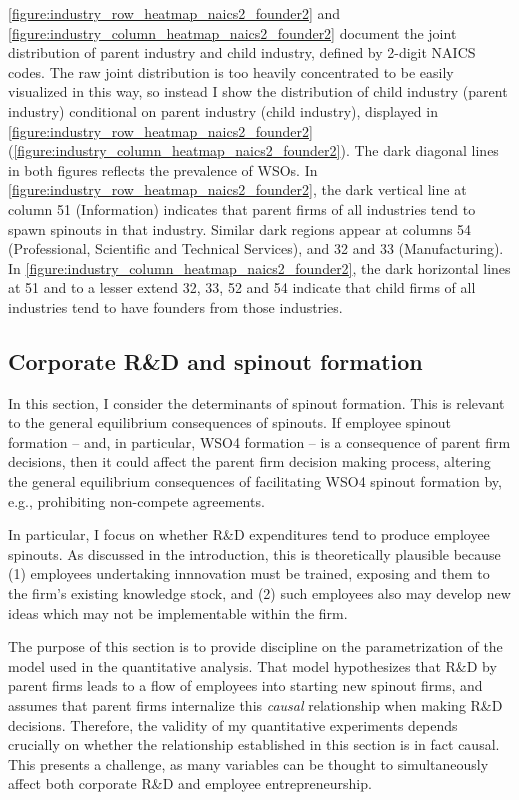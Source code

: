 \documentclass[11pt,english]{article}
\theoremstyle{remark}
\begin{document}
\autoref{figure:industry_row_heatmap_naics2_founder2} and \autoref{figure:industry_column_heatmap_naics2_founder2} document the joint distribution of parent industry and child industry, defined by 2-digit NAICS codes. The raw joint distribution is too heavily concentrated to be easily visualized in this way, so instead I show the distribution of child industry (parent industry) conditional on parent industry (child industry), displayed in \autoref{figure:industry_row_heatmap_naics2_founder2} (\autoref{figure:industry_column_heatmap_naics2_founder2}). The dark diagonal lines in both figures reflects the prevalence of WSOs. In \autoref{figure:industry_row_heatmap_naics2_founder2}, the dark vertical line at column 51 (Information) indicates that parent firms of all industries tend to spawn spinouts in that industry. Similar dark regions appear at columns 54 (Professional, Scientific and Technical Services), and 32 and 33 (Manufacturing). In \autoref{figure:industry_column_heatmap_naics2_founder2}, the dark horizontal lines at 51 and to a lesser extend 32, 33, 52 and 54 indicate that child firms of all industries tend to have founders from those industries.

\subsection{Corporate R\&D and spinout formation}

In this section, I consider the determinants of spinout formation. This is relevant to the general equilibrium consequences of spinouts. If employee spinout formation -- and, in particular, WSO4 formation -- is a consequence of parent firm decisions, then it could affect the parent firm decision making process, altering the general equilibrium consequences of facilitating WSO4 spinout formation by, e.g., prohibiting non-compete agreements. 

In particular, I focus on whether R\&D expenditures tend to produce employee spinouts. As discussed in the introduction, this is theoretically plausible because (1) employees undertaking innnovation must be trained, exposing and them to the firm's existing knowledge stock, and (2) such employees also may develop new ideas which may not be implementable within the firm.  

The purpose of this section is to provide discipline on the parametrization of the model used in the quantitative analysis. That model hypothesizes that R\&D by parent firms leads to a flow of employees into starting new spinout firms, and assumes that parent firms internalize this \textit{causal} relationship when making R\&D decisions. Therefore, the validity of my quantitative experiments depends crucially on whether the relationship established in this section is in fact causal. This presents a challenge, as many variables can be thought to simultaneously affect both corporate R\&D and employee entrepreneurship.
\end{document}
